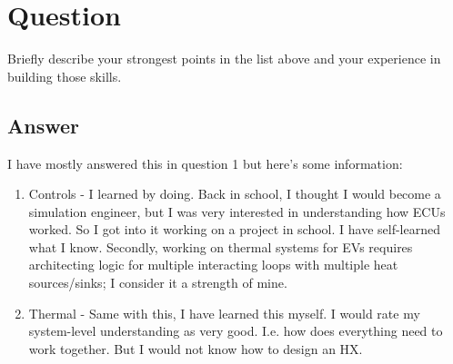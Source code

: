 \section{Question}
Briefly describe your strongest points in the list above and your experience in building
those skills.

\subsection *{Answer}
I have mostly answered this in question 1 but here's some information:
\begin{enumerate}
   \item Controls - I learned by doing. Back in school, I thought I would become a simulation engineer, but I was very interested in understanding how ECUs worked. So I got into it working on a project in school. I have self-learned what I know. Secondly, working on thermal systems for EVs requires architecting logic for multiple interacting loops with multiple heat sources/sinks; I consider it a strength of mine.
   \item Thermal - Same with this, I have learned this myself. I would rate my system-level understanding as very good. I.e. how does everything need to work together. But I would not know how to design an HX.
\end{enumerate}